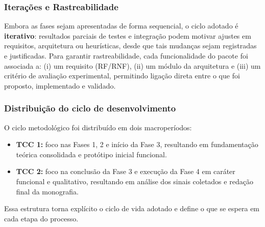 \subsubsection{Iterações e Rastreabilidade}

Embora as fases sejam apresentadas de forma sequencial, o ciclo adotado é \textbf{iterativo}: resultados parciais de testes e integração podem motivar ajustes em requisitos, arquitetura ou heurísticas, desde que tais mudanças sejam registradas e justificadas.
Para garantir rastreabilidade, cada funcionalidade do pacote foi associada a: (i) um requisito (RF/RNF), (ii) um módulo da arquitetura e (iii) um critério de avaliação experimental, permitindo ligação direta entre o que foi proposto, implementado e validado.

\subsubsection{Distribuição do ciclo de desenvolvimento}

O ciclo metodológico foi distribuído em dois macroperíodos:
\begin{itemize}
  \item \textbf{TCC 1:} foco nas Fases 1, 2 e início da Fase 3, resultando em fundamentação teórica consolidada e protótipo inicial funcional.
  \item \textbf{TCC 2:} foco na conclusão da Fase 3 e execução da Fase 4 em caráter funcional e qualitativo, resultando em análise dos sinais coletados e redação final da monografia.
\end{itemize}

Essa estrutura torna explícito o ciclo de vida adotado e define o que se espera em cada etapa do processo.
